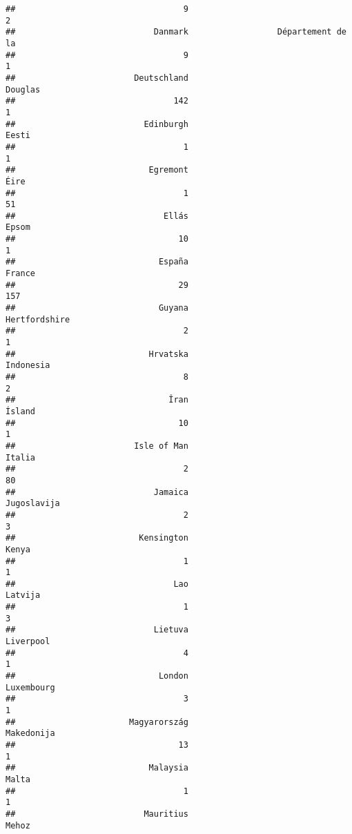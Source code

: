 \documentclass[]{article}
\begin{document}
\begin{verbatim}
##                                  9                                  2 
##                            Danmark                  Département de la 
##                                  9                                  1 
##                        Deutschland                            Douglas 
##                                142                                  1 
##                          Edinburgh                              Eesti 
##                                  1                                  1 
##                           Egremont                               Éire 
##                                  1                                 51 
##                              Ellás                              Epsom 
##                                 10                                  1 
##                             España                             France 
##                                 29                                157 
##                             Guyana                      Hertfordshire 
##                                  2                                  1 
##                           Hrvatska                          Indonesia 
##                                  8                                  2 
##                               Îran                             Ísland 
##                                 10                                  1 
##                        Isle of Man                             Italia 
##                                  2                                 80 
##                            Jamaica                        Jugoslavija 
##                                  2                                  3 
##                         Kensington                              Kenya 
##                                  1                                  1 
##                                Lao                            Latvija 
##                                  1                                  3 
##                            Lietuva                          Liverpool 
##                                  4                                  1 
##                             London                         Luxembourg 
##                                  3                                  1 
##                       Magyarország                         Makedonija 
##                                 13                                  1 
##                           Malaysia                              Malta 
##                                  1                                  1 
##                          Mauritius                              Mehoz 

\end{verbatim}
\end{document}

